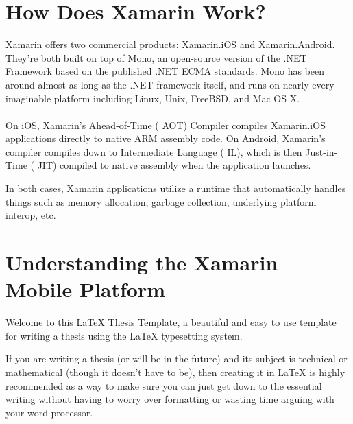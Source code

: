 







 \section{How Does Xamarin Work?}

 Xamarin offers two commercial products: Xamarin.iOS and Xamarin.Android.
 They’re both built on top of Mono, an open-source version of the .NET Framework based on the published .NET ECMA standards.
 Mono has been around almost as long as the .NET framework itself, and runs on nearly every imaginable platform including Linux, Unix, FreeBSD, and Mac OS X.

\paragraph{}
On iOS, Xamarin’s Ahead-of-Time ( AOT) Compiler compiles Xamarin.iOS applications directly to native ARM assembly code. On Android, Xamarin’s compiler compiles down to Intermediate Language ( IL), which is then Just-in-Time ( JIT) compiled to native assembly when the application launches.

In both cases, Xamarin applications utilize a runtime that automatically handles things such as memory allocation, garbage collection, underlying platform interop, etc.


\section{Understanding the Xamarin Mobile Platform}
Welcome to this \LaTeX{} Thesis Template, a beautiful and easy to use template for writing a thesis using the \LaTeX{} typesetting system.

If you are writing a thesis (or will be in the future) and its subject is technical or mathematical (though it doesn't have to be), then creating it in \LaTeX{} is highly recommended as a way to make sure you can just get down to the essential writing without having to worry over formatting or wasting time arguing with your word processor.

